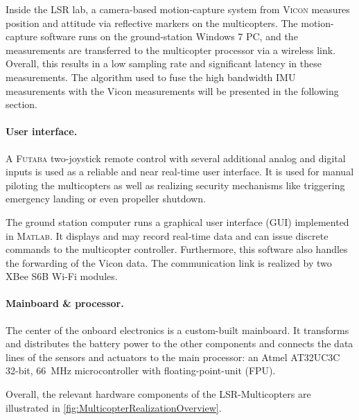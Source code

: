 Inside the LSR lab, a camera-based motion-capture system from \textsc{Vicon} measures position and attitude via reflective markers on the multicopters.
The motion-capture software runs on the ground-station Windows 7 PC, and the measurements are transferred to the multicopter processor via a wireless link.
Overall, this results in a low sampling rate and significant latency in these measurements.
The algorithm used to fuse the high bandwidth IMU measurements with the Vicon measurements will be presented in the following section.

\paragraph{User interface.}
A \textsc{Futaba} two-joystick remote control with several additional analog and digital inputs is used as a reliable and near real-time user interface.
It is used for manual piloting the multicopters as well as realizing security mechanisms like triggering emergency landing or even propeller shutdown.

The ground station computer runs a graphical user interface (GUI) implemented in \textsc{Matlab}.
It displays and may record real-time data and can issue discrete commands to the multicopter controller.
Furthermore, this software also handles the forwarding of the Vicon data.
The communication link is realized by two XBee S6B Wi-Fi modules.

\paragraph{Mainboard \& processor.}
The center of the onboard electronics is a custom-built mainboard.
It transforms and distributes the battery power to the other components and connects the data lines of the sensors and actuators to the main processor:
an Atmel AT32UC3C 32-bit, 66~\unit{MHz} microcontroller with floating-point-unit (FPU).

Overall, the relevant hardware components of the LSR-Multicopters are illustrated in \autoref{fig:MulticopterRealizationOverview}.


